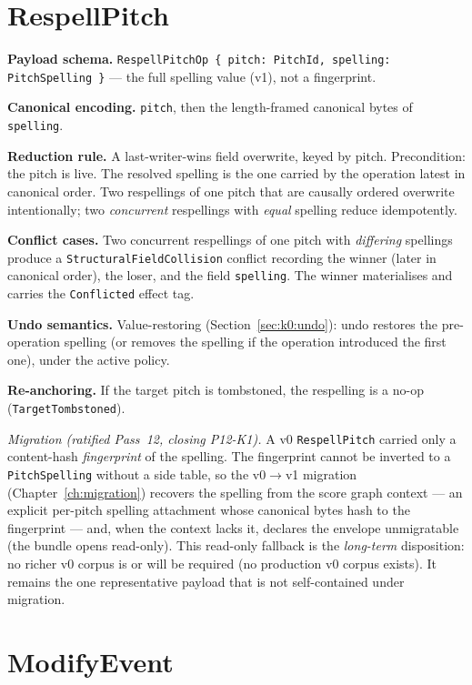 \documentclass[11pt,letterpaper]{report}
\begin{document}
\section{RespellPitch}
\label{sec:k0:respell-pitch}

\textbf{Payload schema.} \texttt{RespellPitchOp \{ pitch: PitchId, spelling:
PitchSpelling \}} --- the full spelling value (v1), not a fingerprint.

\textbf{Canonical encoding.} \texttt{pitch}, then the length-framed canonical
bytes of \texttt{spelling}.

\textbf{Reduction rule.} A last-writer-wins field overwrite, keyed by pitch.
Precondition: the pitch is live. The resolved spelling is the one carried by the
operation latest in canonical order. Two respellings of one pitch that are
causally ordered overwrite intentionally; two \emph{concurrent} respellings with
\emph{equal} spelling reduce idempotently.

\textbf{Conflict cases.} Two concurrent respellings of one pitch with
\emph{differing} spellings produce a \texttt{StructuralFieldCollision} conflict
recording the winner (later in canonical order), the loser, and the field
\texttt{spelling}. The winner materialises and carries the \texttt{Conflicted}
effect tag.

\textbf{Undo semantics.} Value-restoring (Section~\ref{sec:k0:undo}): undo
restores the pre-operation spelling (or removes the spelling if the operation
introduced the first one), under the active policy.

\textbf{Re-anchoring.} If the target pitch is tombstoned, the respelling is a
no-op (\texttt{TargetTombstoned}).

\emph{Migration (ratified Pass~12, closing P12-K1).} A v0
\texttt{RespellPitch} carried only a content-hash \emph{fingerprint} of the
spelling. The fingerprint cannot be inverted to a \texttt{PitchSpelling}
without a side table, so the v0$\rightarrow$v1 migration
(Chapter~\ref{ch:migration}) recovers the spelling from the score graph
context --- an explicit per-pitch spelling attachment whose canonical bytes
hash to the fingerprint --- and, when the context lacks it, declares the
envelope unmigratable (the bundle opens read-only). This read-only fallback
is the \emph{long-term} disposition: no richer v0 corpus is or will be
required (no production v0 corpus exists). It remains the one representative
payload that is not self-contained under migration.

\section{ModifyEvent}
\label{sec:k0:modify-event}
\end{document}
